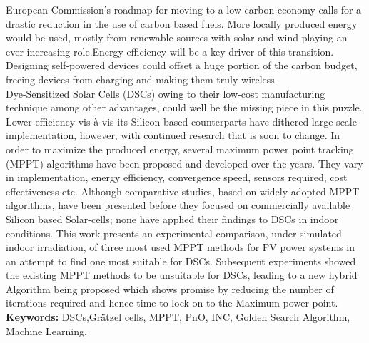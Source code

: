  European Commission's roadmap for moving to a low-carbon economy calls for a drastic reduction in the use of carbon based fuels. More locally produced energy would be used, mostly from renewable sources with solar and wind playing an ever increasing role.Energy efficiency will be a key driver of this transition. Designing self-powered devices could offset a huge portion of the carbon budget, freeing devices from charging and making them truly wireless. \\
 
  Dye-Sensitized Solar Cells (DSCs) owing to their low-cost manufacturing technique among other advantages, could well be the missing piece in this puzzle. Lower efficiency vis-à-vis its Silicon based counterparts have dithered large scale implementation, however, with continued research that is soon to change. In order to  maximize the produced energy, several maximum power point tracking (MPPT) algorithms have been proposed and developed over the years. They vary in implementation, energy efficiency, convergence speed, sensors required, cost effectiveness etc. Although comparative studies, based on widely-adopted MPPT algorithms, have been presented before they focused on commercially available Silicon based Solar-cells; none have applied their findings to DSCs in indoor conditions. This work presents an experimental comparison, under simulated indoor irradiation, of three most used MPPT methods for PV power systems in an attempt to find one most suitable for DSCs. Subsequent experiments showed the existing MPPT methods to be unsuitable for DSCs, leading to a new hybrid Algorithm being proposed which shows promise by reducing the number of iterations required and hence time to lock on to the Maximum power point.\\       

{\bf Keywords:} DSCs,Grätzel cells, MPPT, PnO, INC, Golden Search Algorithm, Machine Learning. 
\acresetall
